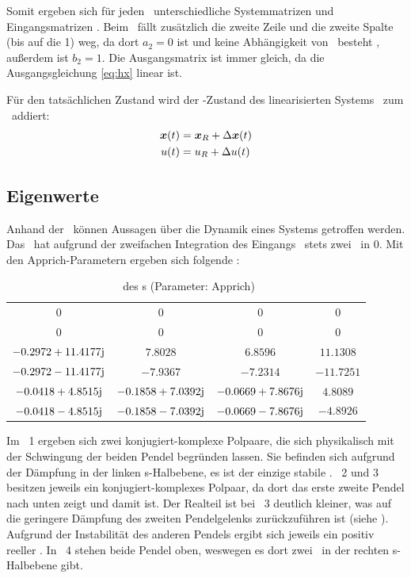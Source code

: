 Somit ergeben sich für jeden \ap\ unterschiedliche Systemmatrizen  und Eingangsmatrizen . Beim \bss\ fällt zusätzlich die zweite Zeile und die zweite Spalte (bis auf die 1) weg, da dort $a_2=0$ ist und keine Abhängigkeit von \xop\ besteht , außerdem ist $b_2=1$.
Die Ausgangsmatrix  ist immer gleich, da die Ausgangsgleichung \eqref{eq:hx} linear ist.

Für den tatsächlichen Zustand wird der \ap-Zustand des linearisierten Systems \dvex\ zum \ap\ addiert:
\begin{subequations} \label{eq:aptransf} \begin{align} 
	\boldsymbol{x}(t)&= \boldsymbol{x}_R + \Delta \boldsymbol{x}(t)	\\
	u(t)&= u_R + \Delta u(t)	
\end{align} \end{subequations} 


\subsection{Eigenwerte}\label{sec:ew}

Anhand der \ewe\ können Aussagen über die Dynamik eines Systems getroffen werden. 
Das \bss\ hat aufgrund der zweifachen Integration des Eingangs \xopp\ stets zwei \ewe\ in 0. 
Mit den Apprich-Parametern ergeben sich folgende \ewe:

\begin{table}[htbp]
	\centering
	\caption{\ewe\ des \bss s (Parameter: Apprich)}
		\begin{tabular}[t]{cccc}
			\toprule
			\ape & \apz & \apd & \apv \\
			\midrule
			$0$	&	$0$	&	$0$	&	$0$	\\
			$0$	&	$0$	&	$0$	&	$0$	\\
			$-0.2972 +11.4177\mathrm{j}$ &    $7.8028						$	&	  $6.8596							$	&   $11.1308$	\\
			$-0.2972 -11.4177\mathrm{j}$ &   $-7.9367						$	&   $-7.2314					$		&  $-11.7251$	\\
			$-0.0418 + 4.8515\mathrm{j}$ &   $-0.1858 + 7.0392\mathrm{j}$	&  $-0.0669 + 7.8676\mathrm{j}$	&  $  4.8089$	\\
			$-0.0418 - 4.8515\mathrm{j}$ &   $-0.1858 - 7.0392\mathrm{j}$	& $ -0.0669 - 7.8676\mathrm{j}	$	&  $ -4.8926$	\\
			\bottomrule
		\end{tabular}
	\label{tab:ewappr}
\end{table}
Im \ap\ 1 ergeben sich zwei konjugiert-komplexe Polpaare, die sich physikalisch mit der Schwingung der beiden Pendel begründen lassen. Sie befinden sich aufgrund der Dämpfung in der linken s-Halbebene, es ist der einzige stabile \ap. \ap\ 2 und 3 besitzen jeweils ein konjugiert-komplexes Polpaar, da dort das erste \bzw zweite Pendel nach unten zeigt und damit  ist. Der Realteil ist bei \ap\ 3 deutlich kleiner, was auf die geringere Dämpfung des zweiten Pendelgelenks zurückzuführen ist (siehe ). Aufgrund der Instabilität des anderen Pendels ergibt sich jeweils ein positiv reeller \ew. In \ap\ 4 stehen beide Pendel oben, weswegen es dort zwei \ewe\ in der rechten s-Halbebene gibt.

